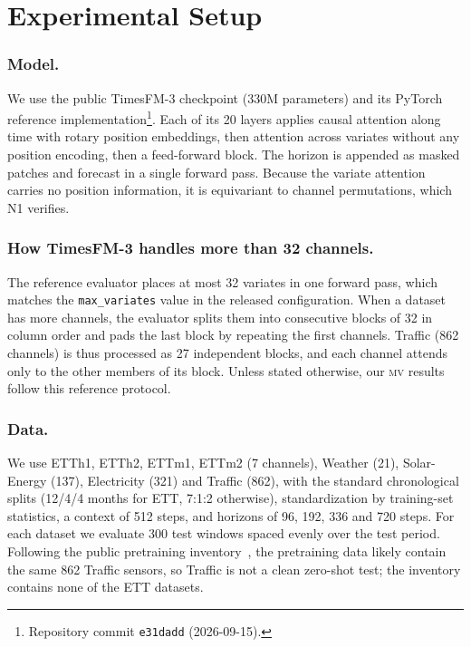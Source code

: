 \documentclass[runningheads]{llncs}
\newcommand{\MV}{\textsc{mv}}
\newcommand{\tfm}{TimesFM-3}
\begin{document}
\section{Experimental Setup}\label{sec:setup}

\subsubsection{Model.}
We use the public \tfm{} checkpoint (330M parameters) and its PyTorch
reference implementation\footnote{Repository commit \texttt{e31dadd}
(2026-09-15).}. Each of its 20 layers applies causal attention along time with
rotary position embeddings, then attention across variates without any
position encoding, then a feed-forward block. The horizon is appended as
masked patches and forecast in a single forward pass. Because the variate
attention carries no position information, it is equivariant to channel
permutations, which N1 verifies.

\subsubsection{How \tfm{} handles more than 32 channels.}
The reference evaluator places at most 32 variates in one forward pass, which
matches the \texttt{max\_variates} value in the released configuration. When
a dataset has more channels, the evaluator splits them into consecutive blocks
of 32 in column order and pads the last block by repeating the first channels.
Traffic (862 channels) is thus processed as 27 independent blocks, and each
channel attends only to the other members of its block. Unless stated
otherwise, our \MV{} results follow this reference protocol.

\subsubsection{Data.}
We use ETTh1, ETTh2, ETTm1, ETTm2 (7 channels), Weather (21),
Solar-Energy (137), Electricity (321) and Traffic (862), with the standard
chronological splits (12/4/4 months for ETT, 7:1:2 otherwise), standardization
by training-set statistics, a context of 512 steps, and
horizons of 96, 192, 336 and 720 steps. For each dataset we evaluate 300 test windows
spaced evenly over the test period. Following the public pretraining
inventory~\cite{gifteval2024}, the pretraining data likely contain the same
862 Traffic sensors, so Traffic is not a clean zero-shot test; the
inventory contains none of the ETT datasets.
\end{document}
